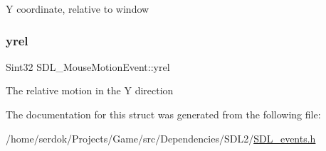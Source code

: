 Y coordinate, relative to window \mbox{\label{structSDL__MouseMotionEvent_a7674c8b92d039ab948f671a180fa7b30}} 
\subsubsection{\texorpdfstring{yrel}{yrel}}
{\footnotesize\ttfamily Sint32 S\+D\+L\+\_\+\+Mouse\+Motion\+Event\+::yrel}

The relative motion in the Y direction 

The documentation for this struct was generated from the following file\+:\begin{DoxyCompactItemize}
\item 
/home/serdok/\+Projects/\+Game/src/\+Dependencies/\+S\+D\+L2/\hyperlink{SDL__events_8h}{S\+D\+L\+\_\+events.\+h}\end{DoxyCompactItemize}
